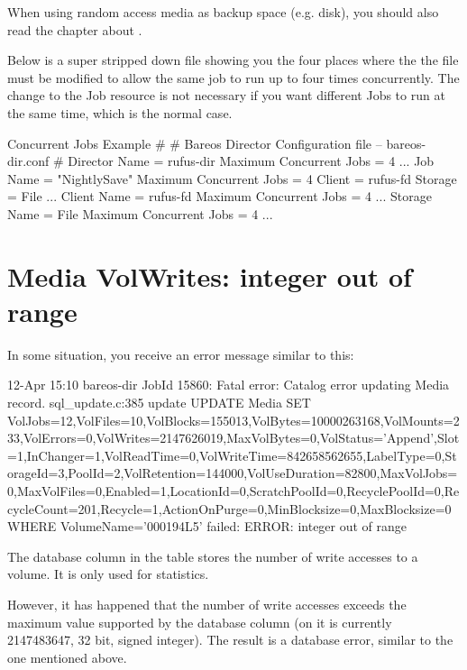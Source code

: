 When using random access media as backup space (e.g. disk), you should also read the chapter about .

Below is a super stripped down  file showing you the four
places where the the file must be modified to allow the same job  
to run up to four times concurrently. The change to the Job
resource is not necessary if you want different Jobs to run at the same time,
which is the normal case. 

\begin{bconfig}{Concurrent Jobs Example}
#
# Bareos Director Configuration file -- bareos-dir.conf
#
Director {
  Name = rufus-dir
  Maximum Concurrent Jobs = 4
  ...
}
Job {
  Name = "NightlySave"
  Maximum Concurrent Jobs = 4
  Client = rufus-fd
  Storage = File
  ...
}
Client {
  Name = rufus-fd
  Maximum Concurrent Jobs = 4
  ...
}
Storage {
  Name = File
  Maximum Concurrent Jobs = 4
  ...
}
\end{bconfig}


\section{Media VolWrites: integer out of range}

In some situation, you receive an error message similar to this:

\begin{bconsole}{}
12-Apr 15:10 bareos-dir JobId 15860: Fatal error: Catalog error updating Media record. sql_update.c:385 update UPDATE Media SET VolJobs=12,VolFiles=10,VolBlocks=155013,VolBytes=10000263168,VolMounts=233,VolErrors=0,VolWrites=2147626019,MaxVolBytes=0,VolStatus='Append',Slot=1,InChanger=1,VolReadTime=0,VolWriteTime=842658562655,LabelType=0,StorageId=3,PoolId=2,VolRetention=144000,VolUseDuration=82800,MaxVolJobs=0,MaxVolFiles=0,Enabled=1,LocationId=0,ScratchPoolId=0,RecyclePoolId=0,RecycleCount=201,Recycle=1,ActionOnPurge=0,MinBlocksize=0,MaxBlocksize=0 WHERE VolumeName='000194L5' failed:
ERROR: integer out of range
\end{bconsole}

The database column  in the  table stores the number of write accesses to a volume.
It is only used for statistics.

However, it has happened that the number of write accesses exceeds the maximum value supported by the database column (on \postgresql it is currently 2147483647, 32 bit, signed integer).
The result is a database error, similar to the one mentioned above.


